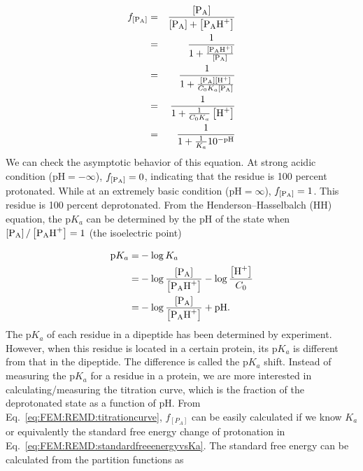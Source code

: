 \begin{eqnarray}
	f_{\left[\ce{P_{A}}\right]} & = & \frac{\left[\ce{P_{A}}\right]}{\left[\ce{P_{A}}\right]+\left[\ce{P_{A}H^{+}}\right]}\nonumber \\
	& = & \frac{1}{1+\frac{\left[\ce{P_{A}H^{+}}\right]}{\left[\ce{P_{A}}\right]}}\nonumber \\
	& = & \frac{1}{1+\frac{\left[\ce{P_{A}}\right]\left[\ce{H^{+}}\right]}{C_{0}K_{a}\left[\ce{P_{A}}\right]}}\nonumber \\
	& = & \frac{1}{1+\frac{1}{C_{0}K_{a}}\left[\ce{H^{+}}\right]}\nonumber \\
	& = & \frac{1}{1+\frac{1}{K_{a}}10^{-\mathrm{pH}}}\label{eq:FEM:REMD:titrationcurve}
\end{eqnarray}
We can check the asymptotic behavior of this equation. At strong
acidic condition ($\mathrm{pH}=-\infty$), $f_{\left[\ce{P_{A}}\right]}=0$, indicating that
the residue is 100 percent protonated. While at an extremely basic
condition ($\mathrm{pH}=\infty$), $f_{\left[\ce{P_{A}}\right]}=1$. This residue is 100
percent deprotonated. From the Henderson–Hasselbalch (HH) equation, 
the $\mathrm{p}K_a$ can be determined by the $\mathrm{pH}$ of the state when 
$\left[\ce{P_{A}}\right]/\left[\ce{P_{A}H^{+}}\right]=1$ (the isoelectric point)

\begin{align}
	\mathrm{p}K_{a}  = & -\log{K_{a}}\notag\\
	 = & -\log{\frac{\left[\ce{P_{A}}\right]}{\left[\ce{P_{A}H^{+}}\right]}}-\log{\frac{\left[\ce{H^{+}}\right]}{C_{0}}}\notag\\
	 = & -\log{\frac{\left[\ce{P_{A}}\right]}{\left[\ce{P_{A}H^{+}}\right]}}+\mathrm{pH}.
	 \label{eq:FEM:REMD:pKa}
\end{align}
The $\mathrm{p}K_{a}$ of each residue in a dipeptide has been determined by
experiment. However, when this residue is located in a certain protein,
its $\mathrm{p}K_{a}$ is different from that in the dipeptide. The difference
is called the $\mathrm{p}K_{a}$ shift. Instead of measuring the $\mathrm{p}K_{a}$
for a residue in a protein, we are more interested in calculating/measuring
the titration curve, which is the fraction of the deprotonated state
as a function of pH. From Eq.~\ref{eq:FEM:REMD:titrationcurve}, $f_{\left[P_{A}\right]}$
can be easily calculated if we know $K_{a}$ or equivalently the standard
free energy change of protonation in Eq.~\ref{eq:FEM:REMD:standardfreeenergyvsKa}.
The standard free energy can be calculated from the partition functions
as

